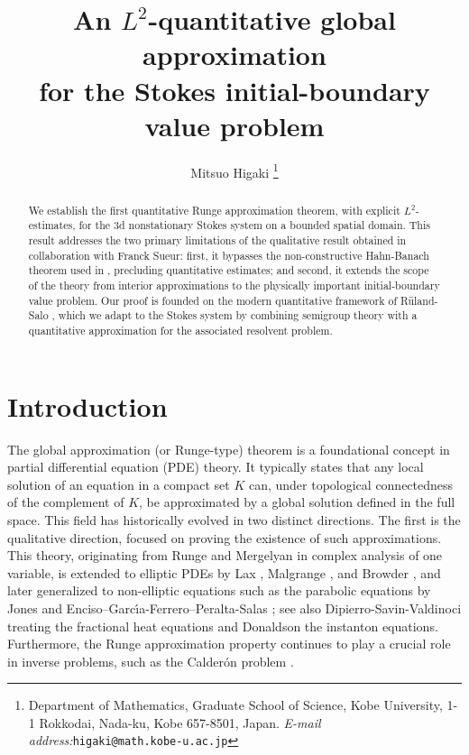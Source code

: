 \documentclass[11pt,a4paper]{article}
\numberwithin{equation}{section}
\begin{document}
\title{An $L^2$-quantitative global approximation \\
for the Stokes initial-boundary value problem}


\author{
Mitsuo Higaki
\thanks{
Department of Mathematics, 
Graduate School of Science, 
Kobe University, 
1-1 Rokkodai, Nada-ku, Kobe 657-8501, Japan.
\textit{E-mail address:}\texttt{higaki@math.kobe-u.ac.jp}
}
}


\date{}


\maketitle


\begin{abstract}
We establish the first quantitative Runge approximation theorem, with explicit $L^2$-estimates, for the 3d nonstationary Stokes system on a bounded spatial domain. This result addresses the two primary limitations of the qualitative result \cite{HigSue2025} obtained in collaboration with Franck Sueur: first, it bypasses the non-constructive Hahn-Banach theorem used in \cite{HigSue2025}, precluding quantitative estimates; and second, it extends the scope of the theory from interior approximations to the physically important initial-boundary value problem. Our proof is founded on the modern quantitative framework of R\"{u}land-Salo \cite{RulSal2019}, which we adapt to the Stokes system by combining semigroup theory with a quantitative approximation for the associated resolvent problem. 
\end{abstract}


\tableofcontents


    \section{Introduction}


The global approximation (or Runge-type) theorem is a foundational concept in partial differential equation (PDE) theory. It typically states that any local solution of an equation in a compact set $K$ can, under topological connectedness of the complement of $K$, be approximated by a global solution defined in the full space. This field has historically evolved in two distinct directions. 
The first is the qualitative direction, focused on proving the existence of such approximations. This theory, originating from Runge \cite{Run1885} and Mergelyan \cite{Mer1952} in complex analysis of one variable, is extended to elliptic PDEs by Lax \cite{Lax1956}, Malgrange \cite{Mal1955}, and Browder \cite{Bro1962}, and later generalized to non-elliptic equations such as the parabolic equations by Jones \cite{Jon1975} and Enciso--Garc\'{\i}a-Ferrero--Peralta-Salas \cite{EGFPS2019}; see also Dipierro-Savin-Valdinoci \cite{DSV2019} treating the fractional heat equations and Donaldson \cite{Don1993} the instanton equations. Furthermore, the Runge approximation property continues to play a crucial role in inverse problems, such as the Calder\'{o}n problem \cite{LLS2020}. 
\end{document}
